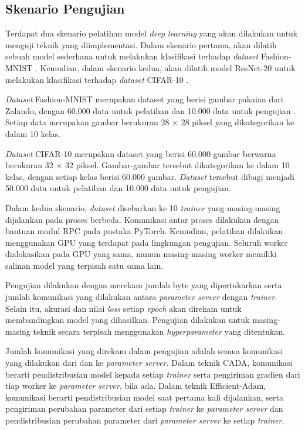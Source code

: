 \subsection{Skenario Pengujian}
Terdapat dua skenario pelatihan model \emph{deep learning} yang akan dilakukan untuk menguji teknik yang diimplementasi. Dalam skenario pertama, akan dilatih sebuah model sederhana untuk melakukan klasifikasi terhadap \emph{dataset} Fashion-MNIST \parencite{xiao2017fashion}. Kemudian, dalam skenario kedua, akan dilatih model ResNet-20 \parencite{he2015deep} untuk melakukan klasifikasi terhadap \emph{dataset} CIFAR-10 \parencite{krizhevsky2009cifar}.

\emph{Dataset} Fashion-MNIST merupakan dataset yang berisi gambar pakaian dari Zalando, dengan 60.000 data untuk pelatihan dan 10.000 data untuk pengujian \parencite{xiao2017fashion}. Setiap data merupakan gambar berukuran 28 $\times$ 28 piksel yang dikategorikan ke dalam 10 kelas.

\emph{Dataset} CIFAR-10 merupakan dataset yang berisi 60.000 gambar berwarna berukuran 32 $\times$ 32 piksel. Gambar-gambar tersebut dikategorikan ke dalam 10 kelas, dengan setiap kelas berisi 60.000 gambar. \emph{Dataset} tersebut dibagi menjadi 50.000 data untuk pelatihan dan 10.000 data untuk pengujian.

Dalam kedua skenario, \emph{dataset} disebarkan ke 10 \emph{trainer} yang masing-masing dijalankan pada proses berbeda. Komunikasi antar proses dilakukan dengan bantuan modul RPC pada pustaka PyTorch. Kemudian, pelatihan dilakukan menggunakan GPU yang terdapat pada lingkungan pengujian. Seluruh worker dialokasikan pada GPU yang sama, namun masing-masing worker memiliki salinan model yang terpisah satu sama lain.

Pengujian dilakukan dengan merekam jumlah byte yang dipertukarkan serta jumlah komunikasi yang dilakukan antara \emph{parameter server} dengan \emph{trainer}. Selain itu, akurasi dan nilai \emph{loss} setiap \emph{epoch} akan direkam untuk membandingkan model yang dihasilkan. Pengujian dilakukan untuk masing-masing teknik secara terpisah menggunakan \emph{hyperparameter} yang ditentukan.

Jumlah komunikasi yang direkam dalam pengujian adalah semua komunikasi yang dilakukan dari dan ke \emph{parameter server}. Dalam teknik CADA, komunikasi berarti pendistribusian model kepada setiap \emph{trainer} serta pengiriman gradien dari tiap worker ke \emph{parameter server}, bila ada. Dalam teknik Efficient-Adam, komunikasi berarti pendistribusian model saat pertama kali dijalankan, serta pengiriman perubahan parameter dari setiap \emph{trainer} ke \emph{parameter server} dan pendistribusian perubahan parameter dari \emph{parameter server} ke setiap \emph{trainer}.

